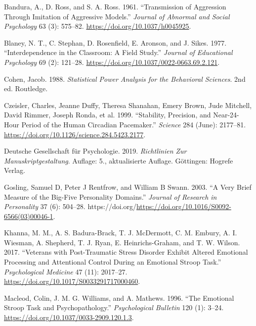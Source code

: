 \documentclass[
]{book}
\newlength{\cslhangindent}
\newenvironment{CSLReferences}[2] %
 {\begin{list}{}{%
  \setlength{\itemindent}{0pt}
  \setlength{\leftmargin}{0pt}
  \setlength{\parsep}{0pt}
  \ifodd #1
   \setlength{\leftmargin}{\cslhangindent}
   \setlength{\itemindent}{-1\cslhangindent}
  \fi
  \setlength{\itemsep}{#2\baselineskip}}}
 {\end{list}}
\theoremstyle{definition}
\theoremstyle{definition}
\theoremstyle{definition}
\theoremstyle{definition}
\theoremstyle{remark}
\begin{document}
\label{refs}
\begin{CSLReferences}{1}{0}
Bandura, A., D. Ross, and S. A. Ross. 1961. {``Transmission of Aggression Through Imitation of Aggressive Models.''} \emph{Journal of Abnormal and Social Psychology} 63 (3): 575--82. \url{https://doi.org/10.1037/h0045925}.

Blaney, N. T., C. Stephan, D. Rosenfield, E. Aronson, and J. Sikes. 1977. {``Interdependence in the Classroom: A Field Study.''} \emph{Journal of Educational Psychology} 69 (2): 121--28. \url{https://doi.org/10.1037/0022-0663.69.2.121}.

Cohen, Jacob. 1988. \emph{Statistical Power Analysis for the Behavioral Sciences}. 2nd ed. Routledge.

Czeisler, Charles, Jeanne Duffy, Theresa Shanahan, Emery Brown, Jude Mitchell, David Rimmer, Joseph Ronda, et al. 1999. {``Stability, Precision, and Near-24-Hour Period of the Human Circadian Pacemaker.''} \emph{Science} 284 (June): 2177--81. \url{https://doi.org/10.1126/science.284.5423.2177}.

Deutsche Gesellschaft für Psychologie. 2019. \emph{Richtlinien Zur {M}anuskriptgestaltung}. Auflage: 5., aktualisierte Auflage. Göttingen: Hogrefe Verlag.

Gosling, Samuel D, Peter J Rentfrow, and William B Swann. 2003. {``A Very Brief Measure of the Big-Five Personality Domains.''} \emph{Journal of Research in Personality} 37 (6): 504--28. https://doi.org/\url{https://doi.org/10.1016/S0092-6566(03)00046-1}.

Khanna, M. M., A. S. Badura-Brack, T. J. McDermott, C. M. Embury, A. I. Wiesman, A. Shepherd, T. J. Ryan, E. Heinrichs-Graham, and T. W. Wilson. 2017. {``Veterans with Post-Traumatic Stress Disorder Exhibit Altered Emotional Processing and Attentional Control During an Emotional Stroop Task.''} \emph{Psychological Medicine} 47 (11): 2017--27. \url{https://doi.org/10.1017/S0033291717000460}.

Macleod, Colin, J. M. G. Williams, and A. Mathews. 1996. {``The Emotional Stroop Task and Psychopathology.''} \emph{Psychological Bulletin} 120 (1): 3--24. \url{https://doi.org/10.1037/0033-2909.120.1.3}.


\end{CSLReferences}
\end{document}
